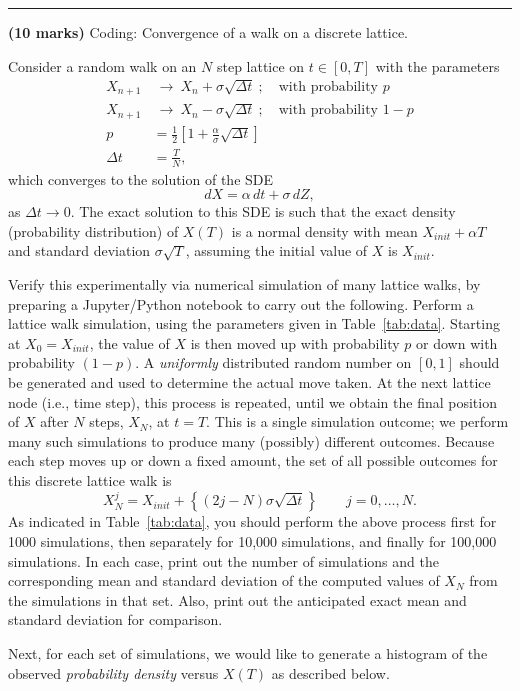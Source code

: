 \documentclass[11pt]{article}
\newcounter{problem}
\newenvironment{problem}{%
    \refstepcounter{problem}%
    \Needspace{7\baselineskip}%
    \par\vspace{0.7em}%
    \noindent\textcolor{courseblue}{\rule{\textwidth}{0.4pt}}%
    \par\vspace{0.5em}%
    \begin{list}{}{%
        \setlength{\leftmargin}{2.3em}%
        \setlength{\labelwidth}{1.8em}%
        \setlength{\labelsep}{0.5em}%
        \setlength{\topsep}{0pt}%
        \setlength{\partopsep}{0pt}%
    }%
    \item[\theproblem.]
}{\end{list}\par\vspace{0.5em}}
\begin{document}
\begin{problem}
\textbf{(10 marks)} Coding: Convergence of a walk on a discrete lattice.

Consider a random walk on an $N$ step lattice on $t\in[0,T]$ with the parameters
\begin{align*}
X_{n+1}&\ \to\ X_n+\sigma\sqrt{\Delta t}\ ;\quad\text{with probability }p\\
X_{n+1}&\ \to\ X_n-\sigma\sqrt{\Delta t}\ ;\quad\text{with probability }1-p\\
p&=\frac12\left[1+\frac{\alpha}{\sigma}\sqrt{\Delta t}\right]\\
\Delta t&=\frac{T}{N},
\end{align*}
which converges to the solution of the SDE
\[
dX=\alpha\,dt+\sigma\,dZ,
\]
as $\Delta t\to0$. The exact solution to this SDE is such that the exact density (probability distribution)
of $X(T)$ is a normal density with mean $X_{init}+\alpha T$ and standard deviation $\sigma\sqrt{T}$,
assuming the initial value of $X$ is $X_{init}$.

Verify this experimentally via numerical simulation of many lattice walks, by preparing a
Jupyter/Python notebook to carry out the following. Perform a lattice walk simulation, using
the parameters given in Table~\ref{tab:data}. Starting at $X_0=X_{init}$, the value of $X$ is then moved up
with probability $p$ or down with probability $(1-p)$. A \emph{uniformly} distributed random number
on $[0,1]$ should be generated and used to determine the actual move taken. At the next lattice
node (i.e., time step), this process is repeated, until we obtain the final position of $X$ after $N$
steps, $X_N$, at $t=T$. This is a single simulation outcome; we perform many such simulations
to produce many (possibly) different outcomes. Because each step moves up or down a fixed
amount, the set of all possible outcomes for this discrete lattice walk is
\[
X_N^j=X_{init}+\left\{(2j-N)\sigma\sqrt{\Delta t}\right\}
\qquad j=0,\ldots,N.
\]
As indicated in Table~\ref{tab:data}, you should perform the above process first for 1000 simulations, then
separately for 10,000 simulations, and finally for 100,000 simulations. In each case, print out
the number of simulations and the corresponding mean and standard deviation of the computed
values of $X_N$ from the simulations in that set. Also, print out the anticipated exact mean and
standard deviation for comparison.

Next, for each set of simulations, we would like to generate a histogram of the observed \emph{probability
density} versus $X(T)$ as described below.


\end{problem}
\end{document}
